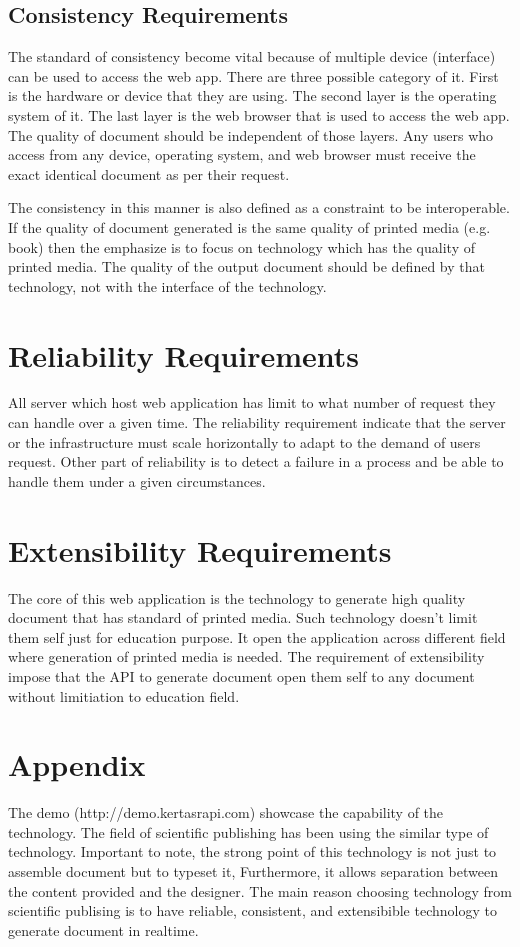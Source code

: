 \documentclass{scrreprt}
\begin{document}
\subsection{Consistency Requirements}
The standard of consistency become vital because of multiple device (interface) can be used to access the web app. There are three possible category of it. First is the hardware or device that they are using. The second layer is the operating system of it. The last layer is the web browser that is used to access the web app. The quality of document should be independent of those layers. Any users who access from any device, operating system, and web browser must receive the exact identical document as per their request.   

The consistency in this manner is also defined as a constraint to be interoperable. If the quality of document generated is the same quality of printed media (e.g. book) then the emphasize is to focus on technology which has the quality of printed media. The quality of the output document should be defined by that technology, not with the interface of the technology. 

\section{Reliability Requirements}
All server which host web application has limit to what number of request they can handle over a given time. The reliability requirement indicate that the server or the infrastructure must scale horizontally to adapt to the demand of users request. Other part of reliability is to detect a failure in a process and be able to handle them under a given circumstances.   

\section{Extensibility Requirements}
The core of this web application is the technology to generate high quality document that has standard of printed media. Such technology doesn't limit them self just for education purpose. It open the application across different field where generation of printed media is needed. The requirement of extensibility impose that the API to generate document open them self to any document without limitiation to education field.  


\section{Appendix}
The demo (http://demo.kertasrapi.com) showcase the capability of the technology. The field of scientific publishing has been using the similar type of technology. Important to note, the strong point of this technology is not just to assemble document but to typeset it, Furthermore, it allows separation between the content provided and the designer. The main reason choosing technology from scientific publising is to have reliable, consistent, and extensibible technology to generate document in realtime.   
\end{document}

